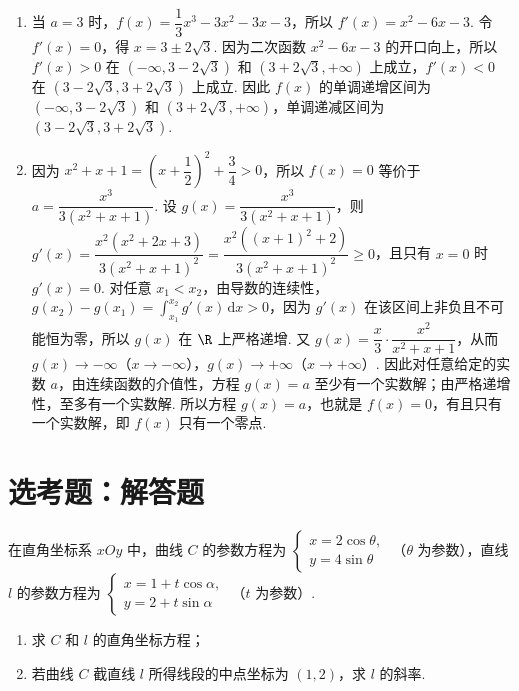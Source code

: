 \begin{solution}
\begin{enumerate}
\item 当 \(a=3\) 时，\(f(x)=\dfrac13x^3-3x^2-3x-3\)，所以 \(f'(x)=x^2-6x-3\). 令 \(f'(x)=0\)，得 \(x=3\pm2\sqrt3\). 因为二次函数 \(x^2-6x-3\) 的开口向上，所以 \(f'(x)>0\) 在 \(\left(-\infty,3-2\sqrt3\right)\) 和 \(\left(3+2\sqrt3,+\infty\right)\) 上成立，\(f'(x)<0\) 在 \(\left(3-2\sqrt3,3+2\sqrt3\right)\) 上成立. 因此 \(f(x)\) 的单调递增区间为 \(\left(-\infty,3-2\sqrt3\right)\) 和 \(\left(3+2\sqrt3,+\infty\right)\)，单调递减区间为 \(\left(3-2\sqrt3,3+2\sqrt3\right)\).
\item 因为 \(x^2+x+1=\left(x+\dfrac12\right)^2+\dfrac34>0\)，所以 \(f(x)=0\) 等价于
\(a=\dfrac{x^3}{3(x^2+x+1)}\). 设 \(g(x)=\dfrac{x^3}{3(x^2+x+1)}\)，则
\(g'(x)=\dfrac{x^2(x^2+2x+3)}{3(x^2+x+1)^2}=\dfrac{x^2\left((x+1)^2+2\right)}{3(x^2+x+1)^2}\ge0\)，且只有 \(x=0\) 时 \(g'(x)=0\). 对任意 \(x_1<x_2\)，由导数的连续性，
\(g(x_2)-g(x_1)=\displaystyle\int_{x_1}^{x_2}g'(x)\,\mathrm{d}x>0\)，因为 \(g'(x)\) 在该区间上非负且不可能恒为零，所以 \(g(x)\) 在 \(\R\) 上严格递增. 又
\(g(x)=\dfrac{x}{3}\cdot\dfrac{x^2}{x^2+x+1}\)，从而 \(g(x)\to-\infty\)（\(x\to-\infty\)），\(g(x)\to+\infty\)（\(x\to+\infty\)）. 因此对任意给定的实数 \(a\)，由连续函数的介值性，方程 \(g(x)=a\) 至少有一个实数解；由严格递增性，至多有一个实数解. 所以方程 \(g(x)=a\)，也就是 \(f(x)=0\)，有且只有一个实数解，即 \(f(x)\) 只有一个零点.
\end{enumerate}
\end{solution}

\section{选考题：解答题}

\begin{problem}
在直角坐标系 \(xOy\) 中，曲线 \(C\) 的参数方程为
\(\begin{cases}
x=2\cos\theta,\\
y=4\sin\theta
\end{cases}\)
（\(\theta\) 为参数），直线 \(l\) 的参数方程为
\(\begin{cases}
x=1+t\cos\alpha,\\
y=2+t\sin\alpha
\end{cases}\)
（\(t\) 为参数）.

\begin{enumerate}
    \item 求 \(C\) 和 \(l\) 的直角坐标方程；
    \item 若曲线 \(C\) 截直线 \(l\) 所得线段的中点坐标为 \((1,2)\)，求 \(l\) 的斜率.
\end{enumerate}
\end{problem}

